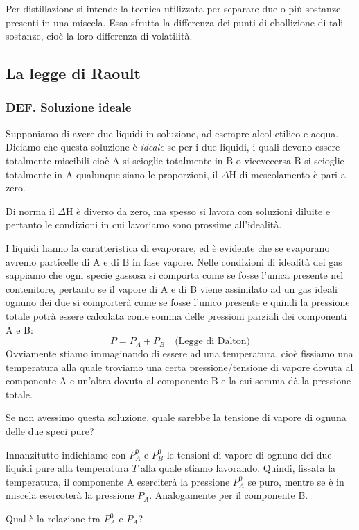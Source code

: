 Per distillazione si intende la tecnica utilizzata per separare due o più sostanze presenti in una miscela. Essa sfrutta la differenza dei punti di ebollizione di tali sostanze, cioè la loro differenza di volatilità.
\subsection{La legge di Raoult}
\subsubsection{DEF. Soluzione ideale}
Supponiamo di avere due liquidi in soluzione, ad esempre alcol etilico e acqua. Diciamo che questa soluzione è \textit{ideale} se per i due liquidi, i quali devono essere totalmente miscibili cioè A si scioglie totalmente in B o vicevecersa B si scioglie totalmente in A qualunque siano le proporzioni, il $\Delta$H di mescolamento è pari a zero.

Di norma il $\Delta$H è diverso da zero, ma spesso si lavora con soluzioni diluite e pertanto le condizioni in cui lavoriamo sono prossime all'idealità.

\vspace{0.2cm}I liquidi hanno la caratteristica di evaporare, ed è evidente che se evaporano avremo particelle di A e di B in fase vapore. Nelle condizioni di idealità dei gas sappiamo che ogni specie gassosa si comporta come se fosse l'unica presente nel contenitore, pertanto se il vapore di A e di B viene assimilato ad un gas ideali ognuno dei due si comporterà come se fosse l'unico presente e quindi la pressione totale potrà essere calcolata come somma delle pressioni parziali dei componenti A e B:
$$P=P_A + P_B \quad \text{(Legge di Dalton)}$$
Ovviamente stiamo immaginando di essere ad una temperatura, cioè fissiamo una temperatura alla quale troviamo una certa pressione/tensione di vapore dovuta al componente A e un'altra dovuta al componente B e la cui somma dà la pressione totale.

Se non avessimo questa soluzione, quale sarebbe la tensione di vapore di ognuna delle due speci pure? 

Innanzitutto indichiamo con $P^0_A$ e $P^0_B$ le tensioni di vapore di ognuno dei due liquidi pure alla temperatura $T$ alla quale stiamo lavorando. Quindi, fissata la temperatura, il componente A eserciterà la pressione $P^0_A$ se puro, mentre se è in miscela esercoterà la pressione $P_A$. Analogamente per il componente B.

Qual è la relazione tra $P^0_A$ e $P_A$?

